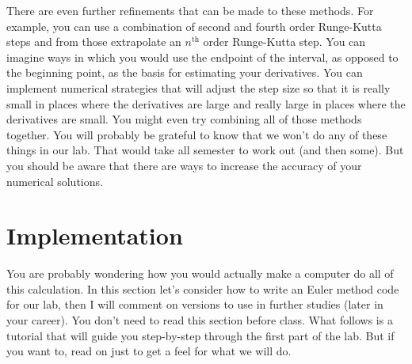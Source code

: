 \documentclass[twoside,11pt,ShortChapTitles]{BYUTextbook}
\begin{document}
There are even further refinements that can be made to these methods. For
example, you can use a combination of second and fourth order Runge-Kutta
steps and from those extrapolate an $n^{\text{th}}$ order Runge-Kutta step.
You can imagine ways in which you would use the endpoint of the interval, as
opposed to the beginning point, as the basis for estimating your derivatives.
You can implement numerical strategies that will adjust the step size so that
it is really small in places where the derivatives are large and really large
in places where the derivatives are small. You might even try combining all of
those methods together. You will probably be grateful to know that we won't do
any of these things in our lab. That would take all semester to work out (and
then some). But you should be aware that there are ways to increase the
accuracy of your numerical solutions.

\section{Implementation}

You are probably wondering how you would actually make a computer do all of
this calculation. In this section let's consider how to write an Euler method
code for our lab, then I will comment on versions to use in further studies
(later in your career). You don't need to read this section before class. What
follows is a tutorial that will guide you step-by-step through the first part
of the lab. But if you want to, read on just to get a feel for what we will do.
\end{document}

